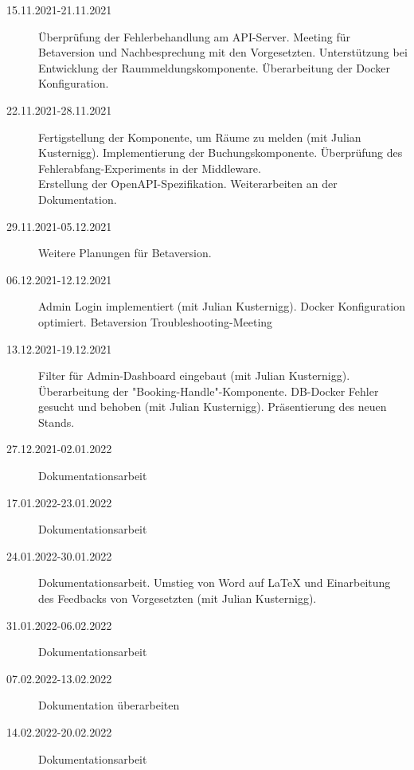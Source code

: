 \begin{description}
    \item[15.11.2021-21.11.2021] Überprüfung der Fehlerbehandlung am API-Server. Meeting für Betaversion und Nachbesprechung mit den Vorgesetzten. Unterstützung bei Entwicklung der Raummeldungskomponente. Überarbeitung der Docker Konfiguration.
    \item[22.11.2021-28.11.2021] Fertigstellung der Komponente, um Räume zu melden (mit Julian Kusternigg). Implementierung der Buchungskomponente. Überprüfung des Fehlerabfang-Experiments in der Middleware. \\
    Erstellung der OpenAPI-Spezifikation. Weiterarbeiten an der Dokumentation.
    \item[29.11.2021-05.12.2021] Weitere Planungen für Betaversion.
    \item[06.12.2021-12.12.2021] Admin Login implementiert (mit Julian Kusternigg). Docker Konfiguration optimiert. Betaversion Troubleshooting-Meeting
    \item[13.12.2021-19.12.2021] Filter für Admin-Dashboard eingebaut (mit Julian Kusternigg). Überarbeitung der "Booking-Handle"-Komponente. DB-Docker Fehler gesucht und behoben (mit Julian Kusternigg). Präsentierung des neuen Stands.
    \item[27.12.2021-02.01.2022] Dokumentationsarbeit 
    \item[17.01.2022-23.01.2022] Dokumentationsarbeit
    \item[24.01.2022-30.01.2022] Dokumentationsarbeit. Umstieg von Word auf LaTeX und Einarbeitung des Feedbacks von Vorgesetzten (mit Julian Kusternigg). 
    \item[31.01.2022-06.02.2022] Dokumentationsarbeit
    \item[07.02.2022-13.02.2022] Dokumentation überarbeiten
    \item[14.02.2022-20.02.2022] Dokumentationsarbeit
\end{description}